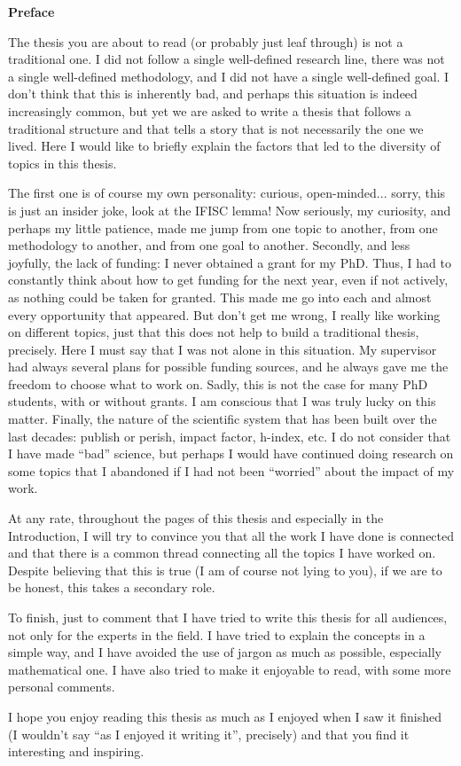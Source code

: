 \pagebreak
\thispagestyle{empty}

\begin{center}
    \textbf{\Large Preface}
\end{center}

The thesis you are about to read (or probably just leaf through) is not a
traditional one. I did not follow a single well-defined research line, there
was not a single well-defined methodology, and I did not have a single
well-defined goal. I don't think that this is inherently bad, and perhaps this
situation is indeed increasingly common, but yet we are asked to write a thesis
that follows a traditional structure and that tells a story that is not
necessarily the one we lived. Here I would like to briefly explain the factors
that led to the diversity of topics in this thesis.

The first one is of course my own personality: curious, open-minded... sorry,
this is just an insider joke, look at the IFISC lemma! Now seriously, my
curiosity, and perhaps my little patience, made me jump from one topic to
another, from one methodology to another, and from one goal to another.
Secondly, and less joyfully, the lack of funding: I never obtained a grant for
my PhD. Thus, I had to constantly think about how to get funding for
the next year, even if not actively, as nothing could be taken for granted.
This made me go into each and almost every opportunity that appeared. But don't
get me wrong, I really like working on different topics, just that this does
not help to build a traditional thesis, precisely. Here I must say that I was
not alone in this situation. My supervisor had always several plans for
possible funding sources, and he always gave me the freedom to choose what to
work on. Sadly, this is not the case for many PhD students, with or without
grants. I am conscious that I was truly lucky on this matter. Finally, the
nature of the scientific system that has been built over the last decades:
publish or perish, impact factor, h-index, etc. I do not consider that I
have made ``bad'' science, but perhaps I would have continued doing research on
some topics that I abandoned if I had not been ``worried'' about the impact of
my work.

At any rate, throughout the pages of this thesis and especially in the
Introduction, I will try to convince you that all the work I have done is
connected and that there is a common thread connecting all the topics I have
worked on. Despite believing that this is true (I am of course not lying to
you), if we are to be honest, this takes a secondary role.

To finish, just to comment that I have tried to write this thesis for all
audiences, not only for the experts in the field. I have tried to explain the
concepts in a simple way, and I have avoided the use of jargon as much as
possible, especially mathematical one. I have also tried to make it enjoyable
to read, with some more personal comments.

I hope you enjoy reading this thesis as much as I enjoyed when I saw it
finished (I wouldn't say ``as I enjoyed it writing it'', precisely) and that
you find it interesting and inspiring.

\vfill